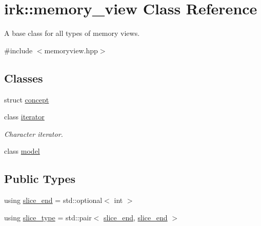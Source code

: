 \hypertarget{classirk_1_1memory__view}{}\section{irk\+:\+:memory\+\_\+view Class Reference}
\label{classirk_1_1memory__view}


A base class for all types of memory views.  




{\ttfamily \#include $<$memoryview.\+hpp$>$}

\subsection*{Classes}
\begin{DoxyCompactItemize}
\item 
struct \mbox{\hyperlink{structirk_1_1memory__view_1_1concept}{concept}}
\item 
class \mbox{\hyperlink{classirk_1_1memory__view_1_1iterator}{iterator}}
\begin{DoxyCompactList}\small\item\em Character iterator. \end{DoxyCompactList}\item 
class \mbox{\hyperlink{classirk_1_1memory__view_1_1model}{model}}
\end{DoxyCompactItemize}
\subsection*{Public Types}
\begin{DoxyCompactItemize}
\item 
using \mbox{\hyperlink{classirk_1_1memory__view_a061864050dba61b052062ec459822885}{slice\+\_\+end}} = std\+::optional$<$ int $>$
\item 
using \mbox{\hyperlink{classirk_1_1memory__view_ac0c1d9600bf81e8cb861a89ab104a43c}{slice\+\_\+type}} = std\+::pair$<$ \mbox{\hyperlink{classirk_1_1memory__view_a061864050dba61b052062ec459822885}{slice\+\_\+end}}, \mbox{\hyperlink{classirk_1_1memory__view_a061864050dba61b052062ec459822885}{slice\+\_\+end}} $>$
\end{DoxyCompactItemize}

